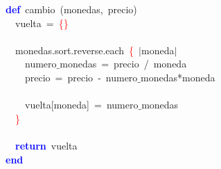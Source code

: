 \noindent
\mbox{}\textbf{\textcolor{Blue}{def}}\ cambio\ \textcolor{BrickRed}{(}monedas\textcolor{BrickRed}{,}\ precio\textcolor{BrickRed}{)} \\
\mbox{}\ \ vuelta\ \textcolor{BrickRed}{=}\ \textcolor{Red}{\{\}} \\
\mbox{} \\
\mbox{}\ \ monedas\textcolor{BrickRed}{.}sort\textcolor{BrickRed}{.}reverse\textcolor{BrickRed}{.}each\ \textcolor{Red}{\{}\ \textcolor{BrickRed}{$|$}moneda\textcolor{BrickRed}{$|$} \\
\mbox{}\ \ \ \ numero$\_$monedas\ \textcolor{BrickRed}{=}\ precio\ \textcolor{BrickRed}{/}\ moneda \\
\mbox{}\ \ \ \ precio\ \textcolor{BrickRed}{=}\ precio\ \textcolor{BrickRed}{-}\ numero$\_$monedas\textcolor{BrickRed}{*}moneda \\
\mbox{} \\
\mbox{}\ \ \ \ vuelta\textcolor{BrickRed}{[}moneda\textcolor{BrickRed}{]}\ \textcolor{BrickRed}{=}\ numero$\_$monedas \\
\mbox{}\ \ \textcolor{Red}{\}} \\
\mbox{} \\
\mbox{}\ \ \textbf{\textcolor{Blue}{return}}\ vuelta \\
\mbox{}\textbf{\textcolor{Blue}{end}} \\
\mbox{}
